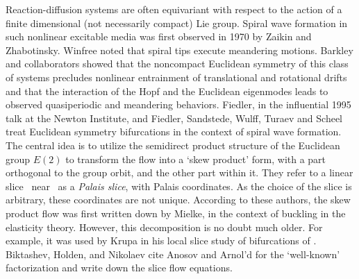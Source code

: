 \documentclass[12pt]{article}
\begin{document}
{Reaction-diffusion systems are often equivariant with respect
to the action of a finite dimensional (not necessarily
compact) Lie group. Spiral wave formation in such nonlinear
excitable media was first observed in 1970 by Zaikin and
Zhabotinsky. Winfree
noted that spiral tips execute meandering motions. Barkley
and collaborators showed that the
noncompact Euclidean symmetry of this class of systems
precludes nonlinear entrainment of translational and
rotational drifts and that the interaction of the Hopf and
the Euclidean eigenmodes leads to observed quasiperiodic and
meandering behaviors. Fiedler, in the influential 1995 talk
at the Newton Institute, and Fiedler, Sandstede, Wulff,
Turaev and  Scheel
treat Euclidean symmetry bifurcations in the context of
spiral wave formation. The central idea is to utilize the
semidirect product structure of the Euclidean group $E(2)$ to
transform the flow into a `skew product' form, with a part
orthogonal to the group orbit, and the other part within it.
They refer to a linear slice
\pSRed\ near \reqv\ as a {\em Palais slice}, with Palais
coordinates.
As the choice of the slice is arbitrary, these
coordinates are not unique. According to these authors, the
skew product flow was first written down by
Mielke, in the context of buckling in the
elasticity theory. However, this decomposition is no doubt
much older. For example, it was  used by
Krupa in his local slice study of
bifurcations of \reqva. Biktashev, Holden, and
Nikolaev cite Anosov and Arnol'd  for
the `well-known' factorization and write
down the slice flow equations.

}
\end{document}

